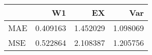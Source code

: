 \begin{tabular}{lrrr}
\toprule
{} &        W1 &        EX &       Var \\
\midrule
MAE &  0.409163 &  1.452029 &  1.098069 \\
MSE &  0.522864 &  2.108387 &  1.205756 \\
\bottomrule
\end{tabular}
